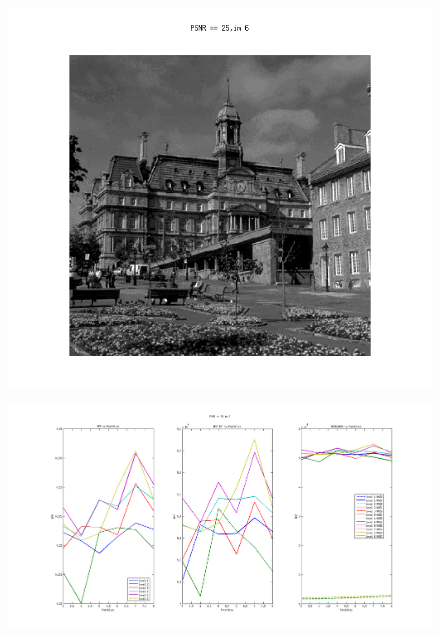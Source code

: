 \documentclass{article}
\begin{document}
\newpage 
\begin{figure}[h]
\centering
    \begin{center}
       \includegraphics[scale=0.3]{6.png}
    \end{center}
    \noindent
\end{figure}
\begin{figure}[h]
\centering
  
    \begin{center}
       \includegraphics[width=180mm]{fig6H.png}
     
    \end{center}
\end{figure}
\end{document}

